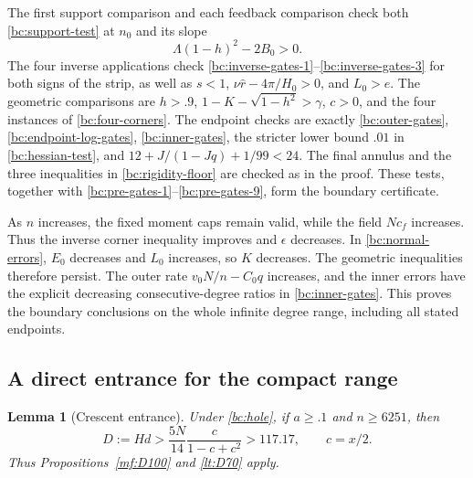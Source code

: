 \documentclass[11pt,reqno]{amsart}
\numberwithin{equation}{section}
\newtheorem{lemma}[theorem]{Lemma}
\theoremstyle{definition}
\theoremstyle{remark}
\begin{document}
The first support comparison and each feedback comparison
check both \eqref{bc:support-test} at $n_0$ and its slope
\[
 \Lambda(1-h)^2-2B_0>0.
\]
The four inverse applications check
\eqref{bc:inverse-gates-1}--\eqref{bc:inverse-gates-3} for both signs
of the strip, as well as $s<1$, $\nu\widehat r-4\pi/H_0>0$,
and $L_0>e$.  The geometric comparisons are $h>.9$,
$1-K-\sqrt{1-h^2}>\gamma$, $c>0$, and the four instances of
\eqref{bc:four-corners}.  The endpoint checks are exactly
\eqref{bc:outer-gates}, \eqref{bc:endpoint-log-gates},
\eqref{bc:inner-gates}, the stricter lower bound $.01$ in
\eqref{bc:hessian-test}, and
$12+J/(1-Jq)+1/99<24$.
The final annulus and the three inequalities in
\eqref{bc:rigidity-floor} are checked as in the proof.
These tests, together with \eqref{bc:pre-gates-1}--\eqref{bc:pre-gates-9},
form the boundary certificate.

As $n$ increases, the fixed moment caps remain valid, while the field
$Nc_f$ increases.  Thus the inverse corner inequality improves and
$\epsilon$ decreases.  In \eqref{bc:normal-errors}, $E_0$ decreases
and $L_0$ increases, so $K$ decreases.  The geometric inequalities
therefore persist.  The outer rate $v_0N/n-C_0q$ increases, and the
inner errors have the explicit decreasing consecutive-degree ratios
in \eqref{bc:inner-gates}.  This proves the boundary conclusions on
the whole infinite degree range, including all stated endpoints.

\subsection{A direct entrance for the compact range}

\begin{lemma}[Crescent entrance]\label{bc:crescent}
Under \eqref{bc:hole}, if $a\geq.1$ and $n\geq6251$, then
\begin{equation}\label{bc:crescent-D}
 D:=Hd>\frac{5N}{14}\frac{c}{1-c+c^2}>117.17,
 \qquad c=x/2.
\end{equation}
Thus Propositions~\ref{mf:D100} and \ref{lt:D70} apply.
\end{lemma}
\end{document}

